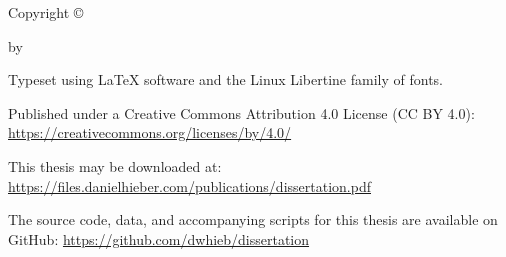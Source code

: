 \setcounter{page}{3}

\vspace*{\fill}

\begin{center}

  \thetitle

  \vspace{3em}

  Copyright {\copyright} \the\year

  by

  \theauthor

\end{center}

\vspace*{\fill}

\begin{flushleft}
\begin{singlespacing}

  \setlength{\parskip}{0.5em}

  Typeset using {\LaTeX} software and the Linux Libertine family of fonts.

  Published under a Creative Commons Attribution 4.0 License (CC BY 4.0): \href{https://creativecommons.org/licenses/by/4.0/}{https://creativecommons.org/licenses/by/4.0/}

  This thesis may be downloaded at: \href{https://files.danielhieber.com/publications/dissertation.pdf}{https://files.danielhieber.com/publications/dissertation.pdf}

  The source code, data, and accompanying scripts for this thesis are available on GitHub: \href{https://github.com/dwhieb/dissertation}{https://github.com/dwhieb/dissertation}

  \setlength{\parskip}{0em}

\end{singlespacing}
\end{flushleft}

